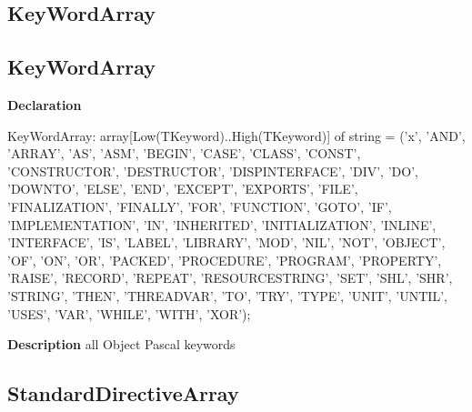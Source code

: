 \documentclass{report}
\newif\ifpdf
\begin{document}
\subsection*{\large{\textbf{KeyWordArray}}\normalsize\hspace{1ex}\hrulefill}
\else
\subsection*{KeyWordArray}
\fi
\label{PasDoc_Tokenizer-KeyWordArray}
\begin{list}{}{
\setlength{\itemindent}{0cm}
\setlength{\listparindent}{0cm}
\setlength{\leftmargin}{\evensidemargin}
\addtolength{\leftmargin}{\tmplength}
\settowidth{\labelsep}{X}
\addtolength{\leftmargin}{\labelsep}
\setlength{\labelwidth}{\tmplength}
}
\item[\textbf{Declaration}\hfill]
\ifpdf
\begin{flushleft}
\fi
\begin{ttfamily}
KeyWordArray: array[Low(TKeyword)..High(TKeyword)] of string =
  ('x', 
    'AND', 'ARRAY', 'AS', 'ASM', 'BEGIN', 'CASE', 'CLASS', 'CONST',
    'CONSTRUCTOR', 'DESTRUCTOR', 'DISPINTERFACE', 'DIV',  'DO', 'DOWNTO',
    'ELSE', 'END', 'EXCEPT', 'EXPORTS', 'FILE', 'FINALIZATION',
    'FINALLY', 'FOR', 'FUNCTION', 'GOTO', 'IF', 'IMPLEMENTATION',
    'IN', 'INHERITED', 'INITIALIZATION', 'INLINE', 'INTERFACE',
    'IS', 'LABEL', 'LIBRARY', 'MOD', 'NIL', 'NOT', 'OBJECT', 'OF',
    'ON', 'OR', 'PACKED', 'PROCEDURE', 'PROGRAM', 'PROPERTY',
    'RAISE', 'RECORD', 'REPEAT', 'RESOURCESTRING', 'SET', 'SHL',
    'SHR', 'STRING', 'THEN', 'THREADVAR', 'TO', 'TRY', 'TYPE',
    'UNIT', 'UNTIL', 'USES', 'VAR', 'WHILE', 'WITH', 'XOR');\end{ttfamily}

\ifpdf
\end{flushleft}
\fi

\par
\item[\textbf{Description}]
all Object Pascal keywords

\end{list}
\ifpdf
\subsection*{\large{\textbf{StandardDirectiveArray}}\normalsize\hspace{1ex}\hrulefill}
\else
\end{document}
